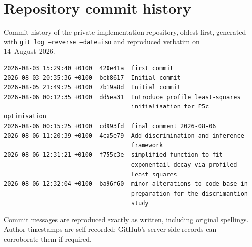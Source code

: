 \documentclass[11pt,a4paper]{article}
\begin{document}
\section{Repository commit history}
Commit history of the private implementation repository, oldest first,
generated with
\texttt{git log --reverse --date=iso}
and reproduced verbatim on 14~August~2026.
\begin{small}
\begin{verbatim}
2026-08-03 15:29:40 +0100  420e41a  first commit
2026-08-03 20:35:36 +0100  bcb8617  Initial commit
2026-08-05 21:49:25 +0100  7b19a8d  Initial commit
2026-08-06 00:12:35 +0100  dd5ea31  Introduce profile least-squares
                                    initialisation for P5c optimisation
2026-08-06 00:15:25 +0100  cd993fd  final comment 2026-08-06
2026-08-06 11:20:39 +0100  4ca5e79  Add discrimination and inference
                                    framework
2026-08-06 12:31:21 +0100  f755c3e  simplified function to fit
                                    exponentail decay via profiled
                                    least squares
2026-08-06 12:32:04 +0100  ba96f60  minor alterations to code base in
                                    preparation for the discrimantion
                                    study
\end{verbatim}
\end{small}
Commit messages are reproduced exactly as written, including original
spellings. Author timestamps are self-recorded; GitHub's server-side
records can corroborate them if required.
\end{document}

